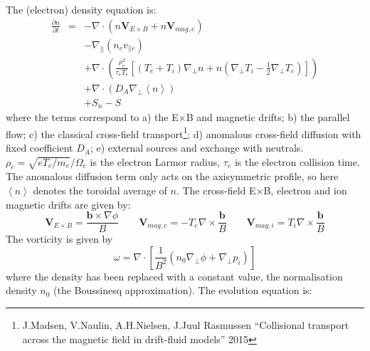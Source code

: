 \documentclass[12pt,a4paper]{article}
\newcommand{\deriv}[2]{\frac{\partial #1}{\partial #2}}
\begin{document}
The (electron) density equation is:
\begin{subequations}
\begin{eqnarray}
  \deriv{n}{t} &=& -\nabla\cdot\left(n\mathbf{V}_{E\times B} + n\mathbf{V}_{mag,e}\right) \\
  && - \nabla_{||}\left(n_e v_{||e}\right) \\
  && + \nabla\cdot\left(\frac{\rho_e^2}{\tau_eT_e}\left[  \left(T_e+T_i\right)\nabla_\perp n  + n\left(\nabla_\perp T_i - \frac{1}{2}\nabla_\perp T_e\right)\right]\right) \\
  && + \nabla\cdot\left(D_A\nabla_\perp \left<n\right>\right) \\
  && + S_n - S 
\end{eqnarray}
\end{subequations}
where the terms correspond to a) the E$\times$B and magnetic drifts; b) the parallel flow; c) the classical cross-field transport\footnote{J.Madsen, V.Naulin, A.H.Nielsen, J.Juul Rasmussen ``Collisional transport across the magnetic field in drift-fluid models'' 2015}; d) anomalous cross-field diffusion with fixed coefficient $D_A$; e) external sources and exchange with neutrals. $\rho_e = \sqrt{eT_e/m_e}/\Omega_e$ is the electron Larmor radius, $\tau_e$ is the electron collision time. The anomalous diffusion term only acts on the axisymmetric profile, so here $\left<n\right>$ denotes the toroidal average of $n$.
The cross-field E$\times$B, electron and ion magnetic drifts are given by:
\begin{equation}
\mathbf{V}_{E\times B} = \frac{\mathbf{b}\times\nabla \phi}{B} \qquad \mathbf{V}_{mag,e} = -T_e\nabla\times\frac{\mathbf{b}}{B} \qquad \mathbf{V}_{mag,i} = T_i\nabla\times\frac{\mathbf{b}}{B}
\end{equation}
The vorticity is given by
\begin{equation}
\omega = \nabla\cdot\left[\frac{1}{B^2}\left(n_0\nabla_\perp\phi + \nabla_\perp p_i\right)\right]
\end{equation}
where the density has been replaced with a constant value, the normalisation density $n_0$ (the Boussinesq approximation).
The evolution equation is:
\end{document}
